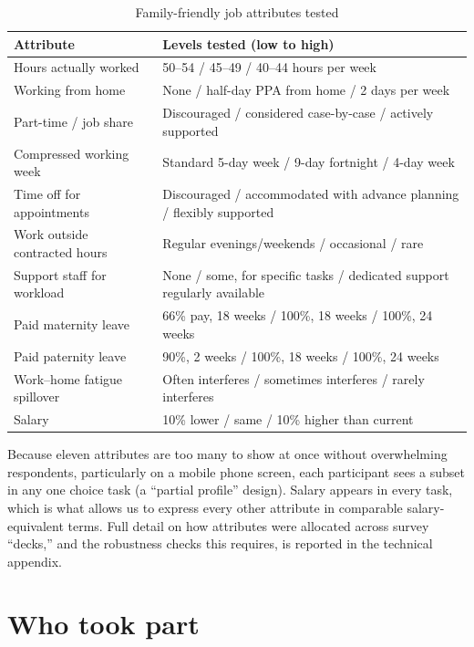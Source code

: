 \begin{table}[htbp]
  \centering
  \caption{Family-friendly job attributes tested}
  \label{table:attributes}
  \begin{tabular}{p{4cm}p{9.5cm}}
    \toprule
    Attribute & Levels tested (low to high) \\
    \midrule
    Hours actually worked & 50--54 / 45--49 / 40--44 hours per week \\
    Working from home & None / half-day PPA from home / 2 days per week \\
    Part-time / job share & Discouraged / considered case-by-case / actively supported \\
    Compressed working week & Standard 5-day week / 9-day fortnight / 4-day week \\
    Time off for appointments & Discouraged / accommodated with advance planning / flexibly supported \\
    Work outside contracted hours & Regular evenings/weekends / occasional / rare \\
    Support staff for workload & None / some, for specific tasks / dedicated support regularly available \\
    Paid maternity leave & 66\% pay, 18 weeks / 100\%, 18 weeks / 100\%, 24 weeks \\
    Paid paternity leave & 90\%, 2 weeks / 100\%, 18 weeks / 100\%, 24 weeks \\
    Work--home fatigue spillover & Often interferes / sometimes interferes / rarely interferes \\
    Salary & 10\% lower / same / 10\% higher than current \\
    \bottomrule
  \end{tabular}
\end{table}

Because eleven attributes are too many to show at once without overwhelming respondents,
particularly on a mobile phone screen, each participant sees a subset in any one choice task
(a ``partial profile'' design). Salary appears in every task, which is what allows us to express
every other attribute in comparable salary-equivalent terms. Full detail on how attributes were
allocated across survey ``decks,'' and the robustness checks this requires, is reported in the
technical appendix.

\section{Who took part}

